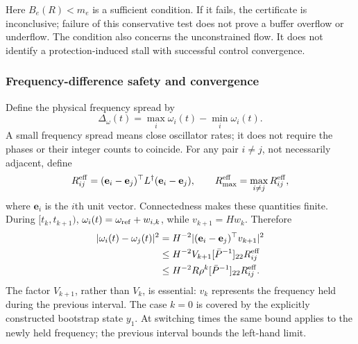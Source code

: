 Here $B_e(R)<m_e$ is a sufficient condition. If it fails, the certificate
is inconclusive; failure of this conservative test does not prove a
buffer overflow or underflow. The condition also concerns the
unconstrained flow. It does not identify a protection-induced stall
with successful control convergence.

\subsubsection{Frequency-difference safety and convergence}
Define the physical frequency spread by
\begin{equation}
 \Delta_\omega(t)=\max_i\omega_i(t)-\min_i\omega_i(t).
 \label{eq:btd_frequency_spread}
\end{equation}
A small frequency spread means close oscillator rates; it does not
require the phases or their integer counts to coincide. For any pair
$i\ne j$, not necessarily adjacent, define
\begin{equation}
 R_{ij}^{\rm eff}=(\mathbf e_i-\mathbf e_j)^\top L^\dagger
                     (\mathbf e_i-\mathbf e_j),
 \qquad R_{\max}^{\rm eff}=\max_{i\ne j}R_{ij}^{\rm eff},
 \label{eq:btd_pair_resistance}
\end{equation}
where $\mathbf e_i$ is the $i$th unit vector. Connectedness makes these
quantities finite. During $[t_k,t_{k+1})$, $\omega_i(t)=
\omega_{\rm ref}+w_{i,k}$, while $v_{k+1}=Hw_k$. Therefore
\begin{align}
 |\omega_i(t)-\omega_j(t)|^2
 &=H^{-2}|(\mathbf e_i-\mathbf e_j)^\top v_{k+1}|^2\nonumber\\
 &\le H^{-2}V_{k+1}[\bar P^{-1}]_{22}R_{ij}^{\rm eff}\nonumber\\
 &\le H^{-2}R\rho^k[\bar P^{-1}]_{22}R_{ij}^{\rm eff}.
 \label{eq:btd_pair_frequency_bound}
\end{align}
The factor $V_{k+1}$, rather than $V_k$, is essential: $v_k$ represents
the frequency held during the previous interval. The case $k=0$ is
covered by the explicitly constructed bootstrap state $y_1$.
At switching times the same bound applies to the newly held frequency;
the previous interval bounds the left-hand limit.

